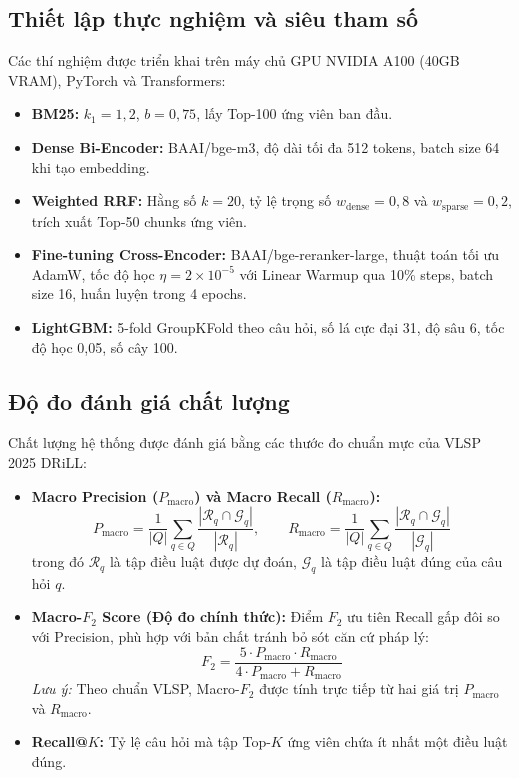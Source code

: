 \documentclass[12pt,a4paper]{article}
\begin{document}
\subsection{Thiết lập thực nghiệm và siêu tham số}
Các thí nghiệm được triển khai trên máy chủ GPU NVIDIA A100 (40GB VRAM), PyTorch và Transformers:
\begin{itemize}[leftmargin=0.7cm]
    \item \textbf{BM25:} $k_1 = 1,2$, $b = 0,75$, lấy Top-100 ứng viên ban đầu.
    \item \textbf{Dense Bi-Encoder:} BAAI/bge-m3, độ dài tối đa 512 tokens, batch size 64 khi tạo embedding.
    \item \textbf{Weighted RRF:} Hằng số $k = 20$, tỷ lệ trọng số $w_{\text{dense}} = 0,8$ và $w_{\text{sparse}} = 0,2$, trích xuất Top-50 chunks ứng viên.
    \item \textbf{Fine-tuning Cross-Encoder:} BAAI/bge-reranker-large, thuật toán tối ưu AdamW, tốc độ học $\eta = 2 \times 10^{-5}$ với Linear Warmup qua 10\% steps, batch size 16, huấn luyện trong 4 epochs.
    \item \textbf{LightGBM:} 5-fold GroupKFold theo câu hỏi, số lá cực đại 31, độ sâu 6, tốc độ học 0,05, số cây 100.
\end{itemize}

\subsection{Độ đo đánh giá chất lượng}
Chất lượng hệ thống được đánh giá bằng các thước đo chuẩn mực của VLSP 2025 DRiLL:
\begin{itemize}[leftmargin=0.7cm]
    \item \textbf{Macro Precision ($P_{\text{macro}}$) và Macro Recall ($R_{\text{macro}}$):}
    \begin{equation}
    P_{\text{macro}} = \frac{1}{|Q|} \sum_{q \in Q} \frac{|\mathcal{R}_q \cap \mathcal{G}_q|}{|\mathcal{R}_q|}, \qquad R_{\text{macro}} = \frac{1}{|Q|} \sum_{q \in Q} \frac{|\mathcal{R}_q \cap \mathcal{G}_q|}{|\mathcal{G}_q|}
    \end{equation}
    trong đó $\mathcal{R}_q$ là tập điều luật được dự đoán, $\mathcal{G}_q$ là tập điều luật đúng của câu hỏi $q$.
    \item \textbf{Macro-$F_2$ Score (Độ đo chính thức):} Điểm $F_2$ ưu tiên Recall gấp đôi so với Precision, phù hợp với bản chất tránh bỏ sót căn cứ pháp lý:
    \begin{equation}
    F_2 = \frac{5 \cdot P_{\text{macro}} \cdot R_{\text{macro}}}{4 \cdot P_{\text{macro}} + R_{\text{macro}}}
    \label{eq:f2_metric}
    \end{equation}
    \textit{Lưu ý:} Theo chuẩn VLSP, Macro-$F_2$ được tính trực tiếp từ hai giá trị $P_{\text{macro}}$ và $R_{\text{macro}}$.
    \item \textbf{Recall@$K$:} Tỷ lệ câu hỏi mà tập Top-$K$ ứng viên chứa ít nhất một điều luật đúng.
\end{itemize}
\end{document}

